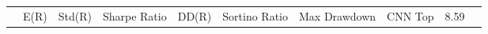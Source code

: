\begin{tabular}{lrrrrrrrrr}
 & E(R) & Std(R) & Sharpe Ratio & DD(R) & Sortino Ratio & Max Drawdown & %
CNN Top & 8.59%
\end{tabular}
